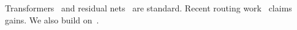 \documentclass{article}
\begin{document}
Transformers~\cite{vaswani2017attention} and residual nets~\cite{he2016resnet}
are standard. Recent routing work~\cite{ghost2024nonexistent} claims gains.
We also build on~\cite{kim2025missing}.
\end{document}

